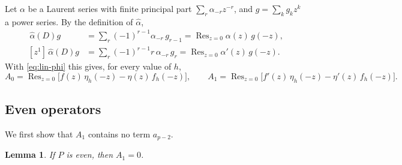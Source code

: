 \documentclass[11pt]{article}
\newtheorem{lemma}[theorem]{Lemma}
\theoremstyle{definition}
\theoremstyle{remark}
\numberwithin{equation}{section}
\newcommand{\hatt}[1]{\widehat{#1}}
\DeclareMathOperator{\Res}{Res}
\begin{document}
Let \(\alpha\) be a Laurent series with finite principal part
\(\sum_r\alpha_{-r}z^{-r}\), and \(g=\sum_kg_kz^k\) a power series. By
the definition of \(\hatt\alpha\),
\begin{align*}
 [z^0]\,\hatt\alpha(D)g&=\sum_r(-1)^{r-1}\alpha_{-r}\,g_{r-1}
 =\Res_{z=0}\alpha(z)\,g(-z),\\
 [z^1]\,\hatt\alpha(D)g&=\sum_r(-1)^{r-1}r\,\alpha_{-r}\,g_{r}
 =\Res_{z=0}\alpha'(z)\,g(-z).
\end{align*}
With \eqref{eq:lin-phi} this gives, for every value of \(h\),
\begin{equation}\label{eq:A-residues}
 A_0=\Res_{z=0}\bigl[f(z)\,\eta_h(-z)-\eta(z)\,f_h(-z)\bigr],\qquad
 A_1=\Res_{z=0}\bigl[f'(z)\,\eta_h(-z)-\eta'(z)\,f_h(-z)\bigr].
\end{equation}

\subsection{Even operators}

We first show that \(A_1\) contains no term \(a_{p-2}\).

\begin{lemma}\label{lem:even-A1}
If \(P\) is even, then \(A_1=0\).
\end{lemma}
\end{document}
